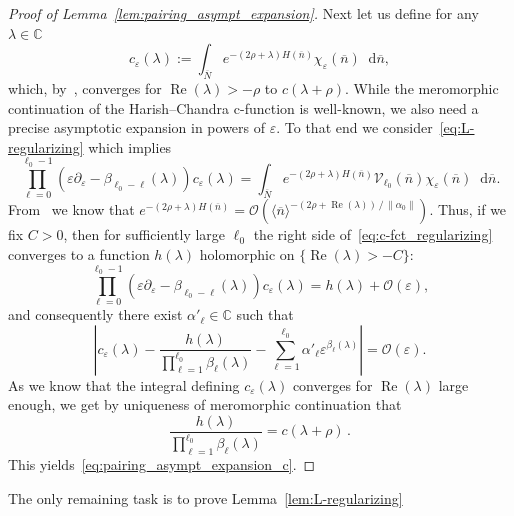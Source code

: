 \documentclass[AHL, Unicode, longabstracts, published]{cedram}
\DeclareMathOperator{\Real}{Re}
\newcommand{\mc}{\mathcal}
\newcommand{\cc}{\mathbb{C}}
\newcommand{\intd}{\mathop{}\!\mathrm{d}}
\newcommand{\bn}{{\overline{n}}}
\newcommand{\bN}{{\overline{N}}}
\begin{document}
\begin{proof}[Proof of Lemma~\ref{lem:pairing_asympt_expansion}]
Next let us define for any $\lambda\in\cc$
\[
c_\varepsilon(\lambda) := \int_{\bN} e^{-(2\rho+\lambda)H(\bn)} \chi_\varepsilon(\bn)
\intd\bn,
\]
which, by~\cite[Chapter IV.6]{Hel84}, converges for $\Real(\lambda)>-\rho$ to $c(\lambda+\rho)$. While the meromorphic continuation of the Harish--Chandra c-function is well-known, we also need a precise asymptotic expansion in powers of $\varepsilon$. To that end we consider~\eqref{eq:L-regularizing} which implies
\begin{equation}\label{eq:c-fct_regularizing}
\prod_{\ell=0}^{\ell_0-1} (\varepsilon\partial_\varepsilon - \beta_{\ell_0-\ell}(\lambda))c_\varepsilon(\lambda) = \int_{\bN} e^{-(2\rho+\lambda)H(\bn)} \mathcal V_{\ell_0}(\bn)\chi_\varepsilon(\bn)\intd\bn.
\end{equation}
From~\cite[Theorem~IX.3.8]{Hel78} we know that $e^{-(2\rho+\lambda)H(\bn)} = \mc O(\langle\bn\rangle^{-(2\rho+\Real(\lambda))\,/\,\|\alpha_0\|})$. Thus, if we fix $C>0$, then for sufficiently large $\ell_0$ the right side of~\eqref{eq:c-fct_regularizing} converges to a function $h(\lambda)$ holomorphic on $\{\Real(\lambda) >-C\}$:
\[
\prod_{\ell=0}^{\ell_0-1} (\varepsilon\partial_\varepsilon - \beta_{\ell_0-\ell}(\lambda))c_\varepsilon(\lambda) = h(\lambda) +\mc{O}(\varepsilon),
\]
and consequently there exist $\alpha'_\ell\in\cc$ such that
\[
\left|c_\varepsilon(\lambda) -
\frac{h(\lambda)}{\displaystyle{\prod_{\ell = 1}^{\ell_0}} \beta_\ell(\lambda)} -\sum_{\ell=1}^{\ell_0} \alpha'_\ell \varepsilon^{\beta_\ell(\lambda)}\right| = \mc{O}(\varepsilon).
\]
As we know that the integral defining $c_\varepsilon(\lambda)$ converges for $\Real(\lambda)$ large enough, we get by uniqueness of meromorphic continuation that
\[
\frac{h(\lambda)}{\displaystyle{\prod_{\ell = 1}^{\ell_0}} \beta_\ell(\lambda)} = c(\lambda+\rho)\,.
\]
This yields~\eqref{eq:pairing_asympt_expansion_c}.
\end{proof}

The only remaining task is to prove Lemma~\ref{lem:L-regularizing}
\end{document}
